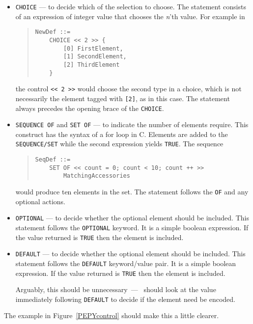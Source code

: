 \begin{itemize}
\item	\verb"CHOICE" --- to decide which of the selection to choose.
The statement consists of an expression of integer value that chooses
the {\em n\/}'th value.  For example in
\begin{quote}\small\begin{verbatim}
NewDef ::=
    CHOICE << 2 >> {
        [0] FirstElement,
        [1] SecondElement,
        [2] ThirdElement
    }
\end{verbatim}\end{quote}
the control \verb"<< 2 >>" would choose the second
type in a choice, which is not necessarily the element tagged with
\verb"[2]", as in this case.
The statement always precedes the opening brace of the \verb"CHOICE".

\item	\verb*"SEQUENCE OF" and \verb*"SET OF" --- to indicate the
number of elements require. This construct has the syntax of a for
loop in C. Elements are added to the \verb"SEQUENCE/SET" while the second
expression yields \verb"TRUE". The sequence
\begin{quote}\small\begin{verbatim}
SeqDef ::=
    SET OF << count = 0; count < 10; count ++ >>
        MatchingAccessories
\end{verbatim}\end{quote}
would produce ten elements in the set.
The statement follows the \verb"OF" and any optional actions.

\item	\verb"OPTIONAL" --- to decide whether the optional element
should be included. This statement follows the \verb"OPTIONAL"
keyword.
It is a simple boolean expression.
If the value returned is \verb"TRUE" then the element is included.

\item	\verb"DEFAULT" --- to decide whether the optional element
should be included. This statement follows the \verb"DEFAULT"
keyword/value pair.
It is a simple boolean expression.
If the value returned is \verb"TRUE" then the element is included.

Arguably, this should be unnecessary~---~ should
look at the value immediately following \verb"DEFAULT" to decide if the
element need be encoded.

\end{itemize}
The example in Figure~\ref{PEPYcontrol} should make this a little
clearer.

